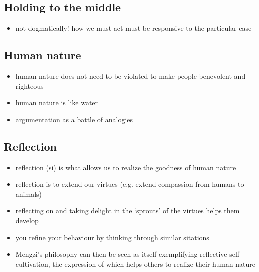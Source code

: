 \documentclass[emulatestandardclasses]{scrartcl}
\begin{document}
\subsection{Holding to the middle}

\begin{itemize}
  \item not dogmatically! how we must act must be responsive to the particular case
\end{itemize}


\subsection{Human nature}

\begin{itemize}
  \item human nature does not need to be violated to make people benevolent and righteous
  \item human nature is like water
  \item argumentation as a battle of analogies
\end{itemize}



\subsection{Reflection}

\begin{itemize}
  \item reflection (si) is what allows us to realize the goodness of human nature
  \item reflection is to extend our virtues (e.g. extend compassion from humans to animals)
  \item reflecting on and taking delight in the ‘sprouts’ of the virtues helps them develop
  \item you refine your behaviour by thinking through similar sitations
  \item Mengzi’s philosophy can then be seen as itself exemplifying reflective self-cultivation, the expression of which helps others to realize their human nature
\end{itemize}
\end{document}
